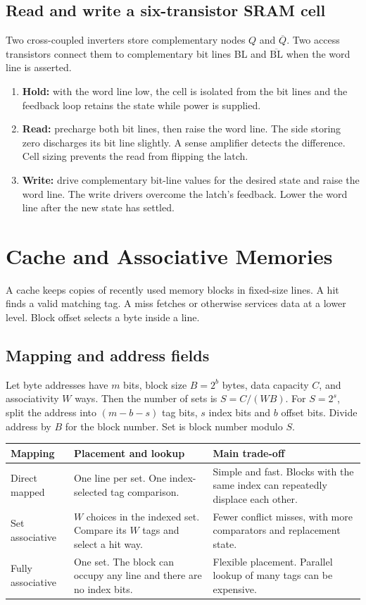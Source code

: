 \documentclass[12pt,a4paper]{article}
\begin{document}
\subsection{Read and write a six-transistor SRAM cell}
Two cross-coupled inverters store complementary nodes $Q$ and $\overline Q$. Two access transistors connect them to complementary bit lines BL and $\overline{\mathrm{BL}}$ when the word line is asserted.
\begin{enumerate}[leftmargin=*,itemsep=3pt]
\item \textbf{Hold:} with the word line low, the cell is isolated from the bit lines and the feedback loop retains the state while power is supplied.
\item \textbf{Read:} precharge both bit lines, then raise the word line. The side storing zero discharges its bit line slightly. A sense amplifier detects the difference. Cell sizing prevents the read from flipping the latch.
\item \textbf{Write:} drive complementary bit-line values for the desired state and raise the word line. The write drivers overcome the latch's feedback. Lower the word line after the new state has settled.
\end{enumerate}

\section{Cache and Associative Memories}
\begin{tcolorbox}[defbox,title={Cache line, hit and miss}]
A cache keeps copies of recently used memory blocks in fixed-size lines. A hit finds a valid matching tag. A miss fetches or otherwise services data at a lower level. Block offset selects a byte inside a line.
\end{tcolorbox}
\subsection{Mapping and address fields}
Let byte addresses have $m$ bits, block size $B=2^b$ bytes, data capacity $C$, and associativity $W$ ways. Then the number of sets is $S=C/(WB)$. For $S=2^s$, split the address into $(m-b-s)$ tag bits, $s$ index bits and $b$ offset bits. Divide address by $B$ for the block number. Set is block number modulo $S$.
\par\vspace{6pt}\noindent
\begin{tabularx}{\linewidth}{|B{3.2cm}|Y|Y|}\hline
Mapping & Placement and lookup & Main trade-off \\ \hline
Direct mapped & One line per set. One index-selected tag comparison. & Simple and fast. Blocks with the same index can repeatedly displace each other. \\ \hline
Set associative & $W$ choices in the indexed set. Compare its $W$ tags and select a hit way. & Fewer conflict misses, with more comparators and replacement state. \\ \hline
Fully associative & One set. The block can occupy any line and there are no index bits. & Flexible placement. Parallel lookup of many tags can be expensive. \\ \hline
\end{tabularx}
\end{document}
